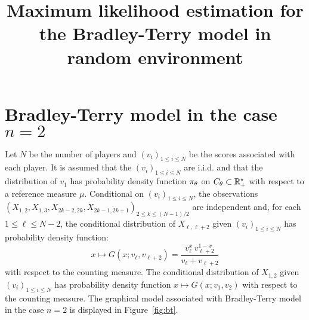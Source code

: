 


\title{Maximum likelihood estimation for the Bradley-Terry model in random environment}
\date{}

\author{}

\lhead{}

\maketitle

\begin{abstract}

\end{abstract}

\section*{Bradley-Terry model in the case $n=2$}
Let $N$ be the number of players and $(v_i)_{1\le i\le N}$ be the scores associated with each player. It is assumed that the $(v_i)_{1\le i\le N}$ are i.i.d. and that the distribution of $v_1$ has probability density function $\pi_{\theta}$ on $C_{\theta}\subset \mathbb{R}_+^{\star}$ with respect to a reference measure $\mu$. Conditional on $(v_i)_{1 \le i \le N}$, the observations $(X_{1,2},X_{1,3}, X_{2k-2,2k}, X_{2k-1,2k+1})_{2\le k \le (N-1)/2}$ are independent and, for each $1\le \ell\le N-2$, the conditional distribution of $X_{\ell,\ell+2}$ given $(v_i)_{1\le i\le N}$ has probability density function:
\begin{equation}
\label{eq:defG}
x\mapsto G (x;v_{\ell},v_{\ell+2}) = \frac{v_{\ell}^x\,v_{\ell+2}^{1-x}}{v_{\ell} + v_{\ell+2}}
\end{equation}
with respect to the counting measure. The conditional distribution of $X_{1,2}$ given $(v_i)_{1\le i\le N}$ has probability density function $x\mapsto G (x;v_{1},v_{2})$ with respect to the counting measure.
The graphical model associated with Bradley-Terry model in the case $n=2$ is displayed in Figure~\ref{fig:bt}.
